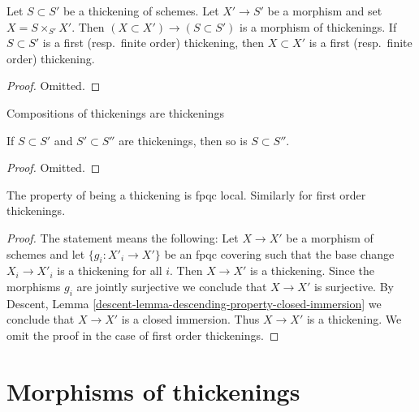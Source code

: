 \begin{lemma}
\label{lemma-base-change-thickening}
Let $S \subset S'$ be a thickening of schemes. Let $X' \to S'$ be a morphism
and set $X = S \times_{S'} X'$. Then $(X \subset X') \to (S \subset S')$
is a morphism of thickenings. If $S \subset S'$ is a first
(resp.\ finite order) thickening, then $X \subset X'$ is a first
(resp.\ finite order) thickening.
\end{lemma}

\begin{proof}
Omitted.
\end{proof}

\begin{lemma}
\label{lemma-composition-thickening}
\begin{slogan}
Compositions of thickenings are thickenings
\end{slogan}
If $S \subset S'$ and $S' \subset S''$ are thickenings, then so is
$S \subset S''$.
\end{lemma}

\begin{proof}
Omitted.
\end{proof}

\begin{lemma}
\label{lemma-descending-property-thickening}
The property of being a thickening is fpqc local.
Similarly for first order thickenings.
\end{lemma}

\begin{proof}
The statement means the following: Let $X \to X'$ be a morphism
of schemes and let $\{g_i : X'_i \to X'\}$
be an fpqc covering such that the base change $X_i \to X'_i$
is a thickening for all $i$. Then $X \to X'$ is a thickening.
Since the morphisms $g_i$ are jointly surjective we conclude
that $X \to X'$ is surjective. By
Descent, Lemma \ref{descent-lemma-descending-property-closed-immersion}
we conclude that $X \to X'$ is a closed immersion.
Thus $X \to X'$ is a thickening. We omit the proof in the
case of first order thickenings.
\end{proof}









\section{Morphisms of thickenings}
\label{section-morphisms-thickenings}

